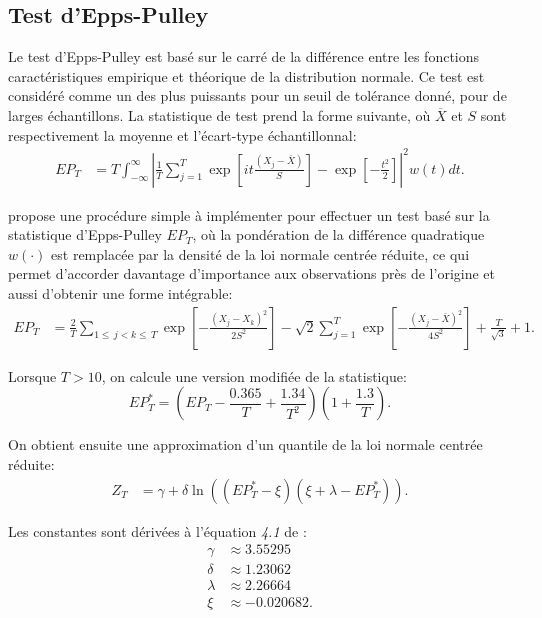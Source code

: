 \subsection{Test d’Epps-Pulley}
\label{sec:test-de-epps}

Le test d’Epps-Pulley \citep{epps1983test} est basé sur le carré de la
différence entre les fonctions caractéristiques empirique et théorique
de la distribution normale. Ce test est considéré comme un des plus
puissants pour un seuil de tolérance donné, pour de larges
échantillons. La statistique de test prend la forme suivante, où
$\overline{X}$ et $S$ sont respectivement la moyenne et l'écart-type
échantillonnal:
\begin{align}
  \label{eq:statistiqueEppsPulley}
  EP_T &= T\int_{-\infty}^{\infty} \left\vert\frac{1}{T}\sum_{j=1}^T
    \exp\left[it\frac{\left(X_j-\bar{X} \right)}{S} \right] - \exp
    \left[-\frac{t^2}{2} \right]\right\vert^2w(t)dt.
\end{align}

\cite{henze1990approximation} propose une procédure simple à
implémenter pour effectuer un test basé sur la statistique
d’Epps-Pulley $EP_T$, où la pondération de la différence quadratique
$w(\cdot)$ est remplacée par la densité de la loi normale centrée
réduite, ce qui permet d'accorder davantage d'importance aux
observations près de l'origine et aussi d'obtenir une forme
intégrable:
\begin{align}
  \label{eq:EppsPulley}
  EP_T &= \frac{2}{T} \sum_{1\leq\,j<k\leq\,T}
  \exp\left[-\frac{\left(X_j-X_k \right)^2}{2S^2}\right] - \sqrt{2}
  \sum_{j=1}^T \exp\left[-\frac{\left(X_j-\bar{X} \right)^2}{4S^2}
  \right]+\frac{T}{\sqrt{3}}+1.
\end{align}

Lorsque $T>10$, on calcule une version modifiée de la statistique:
\begin{equation}
  \label{eq:EppsPulleyMod}
  EP_T^{*} = \left(EP_T-\frac{0.365}{T}+\frac{1.34}{T^2}\right)\left(1+\frac{1.3}{T}\right).
\end{equation}

On obtient ensuite une approximation d'un quantile de la loi normale
centrée réduite:
\begin{align}
  \label{eq:ZEppsPulley}
  Z_T &= \gamma + \delta\ln\left(\left(EP_T^{*}-\xi
    \right)\left(\xi+\lambda-EP_T^{*} \right) \right).
\end{align}

Les constantes sont dérivées à l'équation \emph{4.1} de
\cite{henze1990approximation}:
\begin{align*}
  \gamma &\approx 3.55295 \\
  \delta &\approx 1.23062 \\
  \lambda &\approx 2.26664 \\
  \xi &\approx -0.020682.
\end{align*}

